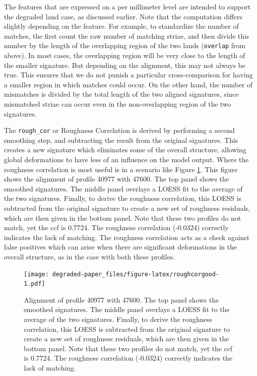 \documentclass[12pt,]{article}
\theoremstyle{definition}
\theoremstyle{definition}
\theoremstyle{definition}
\theoremstyle{remark}
\begin{document}
The features that are expressed on a per millimeter level are intended
to support the degraded land case, as discussed earlier. Note that the
computation differs slightly depending on the feature. For example, to
standardize the number of matches, the first count the raw number of
matching striae, and then divide this number by the length of the
overlapping region of the two lands (\texttt{overlap} from above). In
most cases, the overlapping region will be very close to the length of
the smaller signature. But depending on the alignment, this may not
always be true. This ensures that we do not punish a particular
cross-comparison for having a smaller region in which matches could
occur. On the other hand, the number of mismatches is divided by the
total length of the two aligned signatures, since mismatched striae can
occur even in the non-overlapping region of the two signatures.

The \texttt{rough\_cor} or Roughness Correlation is derived by
performing a second smoothing step, and subtracting the result from the
original signatures. This creates a new signature which eliminates some
of the overall structure, allowing global deformations to have less of
an influence on the model output. Where the roughness correlation is
most useful is in a scenario like Figure \ref{fig:roughcorgood}. This
figure shows the alignment of profile 40977 with 47600. The top panel
shows the smoothed signatures. The middle panel overlays a LOESS fit to
the average of the two signatures. Finally, to derive the roughness
correlation, this LOESS is subtracted from the original signature to
create a new set of roughness residuals, which are then given in the
bottom panel. Note that these two profiles do not match, yet the ccf is
0.7724. The roughness correlation (-0.0324) correctly indicates the lack
of matching. The roughness correlation acts as a check against false
positives which can arise when there are significant deformations in the
overall structure, as in the case with both these profiles.

\begin{figure}[htbp]
\centering
\texttt{[image: degraded-paper\_files/figure-latex/roughcorgood-1.pdf]}
\caption{\label{fig:roughcorgood}Alignment of profile 40977 with 47600. The
top panel shows the smoothed signatures. The middle panel overlays a
LOESS fit to the average of the two signatures. Finally, to derive the
roughness correlation, this LOESS is subtracted from the original
signature to create a new set of roughness residuals, which are then
given in the bottom panel. Note that these two profiles do not match,
yet the ccf is 0.7724. The roughness correlation (-0.0324) correctly
indicates the lack of matching.}
\end{figure}
\end{document}
